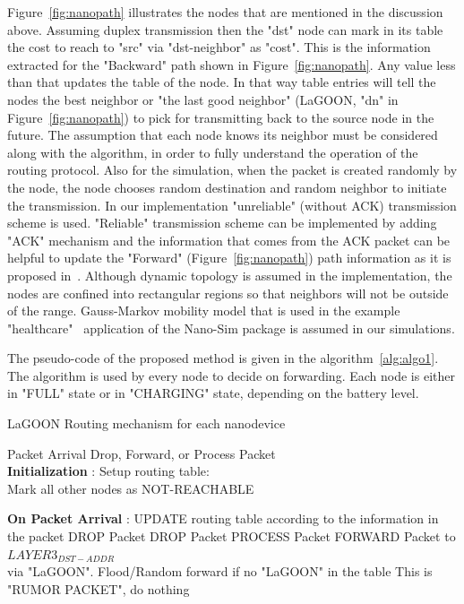 \documentclass[12pt, oneandhalf, chaparabic, sees, ms]{metu}
\begin{document}
Figure~\ref{fig:nanopath} illustrates the nodes that are mentioned in the discussion above.
Assuming duplex transmission then the "dst" node can mark in its table the cost to reach to "src" via "dst-neighbor" as "cost".
This is the information extracted for the "Backward" path shown in Figure~\ref{fig:nanopath}.
Any value less than that updates the table of the node. In that way table entries will tell the nodes the best neighbor 
or "the last good neighbor" (LaGOON, "dn" in Figure~\ref{fig:nanopath}) to pick for transmitting back to the source node in the future. 
The assumption that each node knows its neighbor must be considered along with the algorithm, in order to fully 
understand the operation of the routing protocol. Also for the simulation, when the packet is created randomly by the node, the node chooses 
random destination and random neighbor to initiate the transmission. In our implementation "unreliable" (without ACK) transmission scheme 
is used. "Reliable" transmission scheme can be implemented by adding "ACK" mechanism and the information that comes from the ACK packet can be helpful to update the "Forward" (Figure~\ref{fig:nanopath}) path information as it is proposed in~\cite{oteafy2012}. Although dynamic topology is assumed in the implementation, the nodes are confined into rectangular regions so that neighbors 
will not be outside of the range. Gauss-Markov mobility model that is used in the example "healthcare"~\cite{piroPA2013, piroNS32013} application of the 
Nano-Sim package is assumed in our simulations.

The pseudo-code of the proposed method is given in the algorithm~\ref{alg:algo1}. The algorithm is used by every node to decide on forwarding.
Each node is either in "FULL" state or in "CHARGING" state, depending on the battery level. 

 \begin{algorithm}[H]
 \caption{LaGOON Routing mechanism for each nanodevice}
 \label{alg:algo1}
 \begin{algorithmic}[1]
 \renewcommand{\algorithmicrequire}{\textbf{Input:}}
 \renewcommand{\algorithmicensure}{\textbf{Output:}}
 \REQUIRE Packet Arrival
 \ENSURE  Drop, Forward, or Process Packet
 \\ \textbf{Initialization} :
  \STATE Setup routing table: \\ Mark all other nodes as {NOT-REACHABLE}  
  
  \textbf{On Packet Arrival} :
   \STATE UPDATE routing table according to the information in the packet
    \STATE DROP Packet
   \ELSE
      \STATE DROP Packet
      \STATE PROCESS Packet
      \STATE FORWARD Packet to $LAYER3_{DST-ADDR}$ \\via "LaGOON". Flood/Random forward if no "LaGOON" in the table
     \ELSE
      \STATE This is "RUMOR PACKET", do nothing
     \ENDIF
   \ENDIF
 \end{algorithmic}
 \end{algorithm}
 
\end{document}

